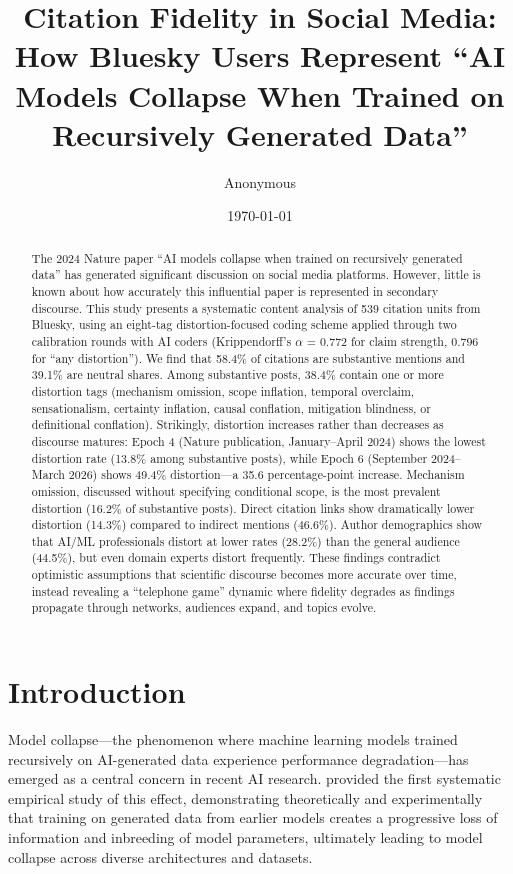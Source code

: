 \documentclass[twocolumn,11pt]{article}
\title{Citation Fidelity in Social Media: How Bluesky Users Represent ``AI Models Collapse When Trained on Recursively Generated Data''}
\author{Anonymous}
\date{\today}
\begin{document}
\maketitle

\begin{abstract}
The 2024 Nature paper ``AI models collapse when trained on recursively generated data'' \cite{Shumailov2024} has generated significant discussion on social media platforms. However, little is known about how accurately this influential paper is represented in secondary discourse. This study presents a systematic content analysis of 539 citation units from Bluesky, using an eight-tag distortion-focused coding scheme applied through two calibration rounds with AI coders (Krippendorff's $\alpha$ \cite{Krippendorff2019} = 0.772 for claim strength, 0.796 for ``any distortion''). We find that 58.4\% of citations are substantive mentions and 39.1\% are neutral shares. Among substantive posts, 38.4\% contain one or more distortion tags (mechanism omission, scope inflation, temporal overclaim, sensationalism, certainty inflation, causal conflation, mitigation blindness, or definitional conflation). Strikingly, distortion increases rather than decreases as discourse matures: Epoch 4 (Nature publication, January--April 2024) shows the lowest distortion rate (13.8\% among substantive posts), while Epoch 6 (September 2024--March 2026) shows 49.4\% distortion---a 35.6 percentage-point increase. Mechanism omission, discussed without specifying conditional scope, is the most prevalent distortion (16.2\% of substantive posts). Direct citation links show dramatically lower distortion (14.3\%) compared to indirect mentions (46.6\%). Author demographics show that AI/ML professionals distort at lower rates (28.2\%) than the general audience (44.5\%), but even domain experts distort frequently. These findings contradict optimistic assumptions that scientific discourse becomes more accurate over time, instead revealing a ``telephone game'' dynamic where fidelity degrades as findings propagate through networks, audiences expand, and topics evolve.

\end{abstract}

\section{Introduction}

Model collapse—the phenomenon where machine learning models trained recursively on AI-generated data experience performance degradation—has emerged as a central concern in recent AI research. \cite{Shumailov2024} provided the first systematic empirical study of this effect, demonstrating theoretically and experimentally that training on generated data from earlier models creates a progressive loss of information and inbreeding of model parameters, ultimately leading to model collapse across diverse architectures and datasets.
\end{document}
